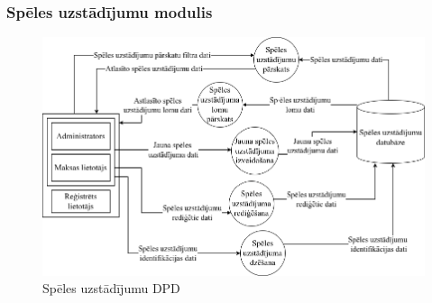 \subsubsection{Spēles uzstādījumu modulis}

\begin{figure}[htbp]
	\centering
	\includegraphics[width=\linewidth]{./src/img/SpēlesUzstādījumuModulis.png}
	\caption{Spēles uzstādījumu DPD}
	\label{fig:dpd-2-game-setup}
\end{figure}






